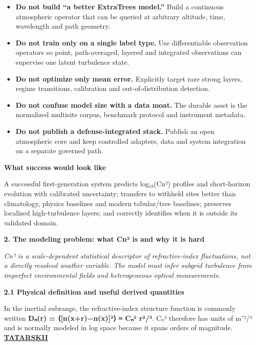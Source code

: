\documentclass[
]{article}
\begin{document}
\begin{itemize}
\item
  \textbf{Do not build ``a better ExtraTrees model.''} Build a
  continuous atmospheric operator that can be queried at arbitrary
  altitude, time, wavelength and path geometry.
\item
  \textbf{Do not train only on a single label type.} Use differentiable
  observation operators so point, path-averaged, layered and integrated
  observations can supervise one latent turbulence state.
\item
  \textbf{Do not optimize only mean error.} Explicitly target rare
  strong layers, regime transitions, calibration and out-of-distribution
  detection.
\item
  \textbf{Do not confuse model size with a data moat.} The durable asset
  is the normalized multisite corpus, benchmark protocol and instrument
  metadata.
\item
  \textbf{Do not publish a defense-integrated stack.} Publish an open
  atmospheric core and keep controlled adapters, data and system
  integration on a separate governed path.
\end{itemize}

\textbf{What success would look like}

A successful first-generation system predicts log₁₀(Cn²) profiles and
short-horizon evolution with calibrated uncertainty; transfers to
withheld sites better than climatology, physics baselines and modern
tabular/tree baselines; preserves localized high-turbulence layers; and
correctly identifies when it is outside its validated domain.

\textbf{2. The modeling problem: what Cn² is and why it is hard}

\emph{Cn² is a scale-dependent statistical descriptor of
refractive-index fluctuations, not a directly resolved weather variable.
The model must infer subgrid turbulence from imperfect environmental
fields and heterogeneous optical measurements.}

\textbf{2.1 Physical definition and useful derived quantities}

In the inertial subrange, the refractive-index structure function is
commonly written \textbf{Dₙ(r) = ⟨{[}n(x+r)−n(x){]}²⟩ ≈ Cₙ² r²/³}. Cₙ²
therefore has units of m⁻²/³ and is normally modeled in log space
because it spans orders of magnitude.
\href{https://ntrl.ntis.gov/NTRL/dashboard/searchResults/titleDetail/TT6850464.xhtml}{\textbf{\ul{TATARSKII}}}
\end{document}
